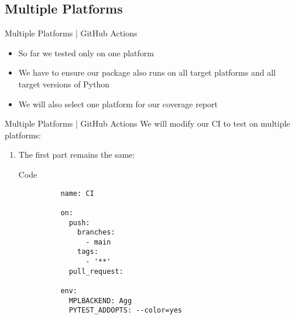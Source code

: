 \subsection{Multiple Platforms}
\begin{frame}[fragile]{Multiple Platforms | GitHub Actions}
 \begin{itemize}
   \setlength{\itemsep}{1em}
   \item So far we tested only on one platform
   \item We have to ensure our package also runs on all target platforms
      and all target versions of Python
   \item We will also select one platform for our coverage report
  \end{itemize}
\end{frame}

\begin{frame}[fragile]{Multiple Platforms | GitHub Actions}
  We will modify our CI to test on multiple platforms:
  \begin{enumerate}
    \item The first part remains the same:
      \begin{block}{Code}
        \begin{verbatim}
          name: CI

          on:
            push:
              branches:
                - main
              tags:
                - '**'
            pull_request:

          env:
            MPLBACKEND: Agg
            PYTEST_ADDOPTS: --color=yes
        \end{verbatim}
      \end{block}
  \end{enumerate}
\end{frame}

